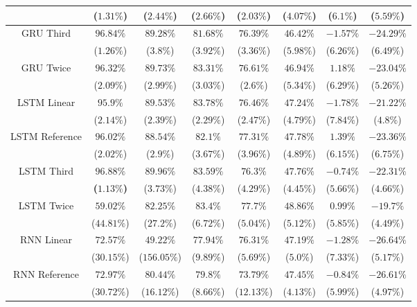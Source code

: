 \begin{table}[!ht]
{\begin{tabular}{|c|c|c|c|c|c|c|c|}
			 & ($1.31\%$) & ($2.44\%$) & ($2.66\%$) & ($2.03\%$) & ($4.07\%$) & ($6.1\%$) & ($5.59\%$) \\ \hline
			\multirow{2}{*}{GRU Third} & $96.84\%$ & $89.28\%$ & $81.68\%$ & $76.39\%$ & $46.42\%$ & $-1.57\%$ & $-24.29\%$ \\
			 & ($1.26\%$) & ($3.8\%$) & ($3.92\%$) & ($3.36\%$) & ($5.98\%$) & ($6.26\%$) & ($6.49\%$) \\ \hline
			\multirow{2}{*}{GRU Twice} & $96.32\%$ & $89.73\%$ & $83.31\%$ & $76.61\%$ & $46.94\%$ & $1.18\%$ & $-23.04\%$ \\
			 & ($2.09\%$) & ($2.99\%$) & ($3.03\%$) & ($2.6\%$) & ($5.34\%$) & ($6.29\%$) & ($5.26\%$) \\ \hline
			\multirow{2}{*}{LSTM Linear} & $95.9\%$ & $89.53\%$ & $83.78\%$ & $76.46\%$ & $47.24\%$ & $-1.78\%$ & $-21.22\%$ \\
			 & ($2.14\%$) & ($2.39\%$) & ($2.29\%$) & ($2.47\%$) & ($4.79\%$) & ($7.84\%$) & ($4.8\%$) \\ \hline
			\multirow{2}{*}{LSTM Reference} & $96.02\%$ & $88.54\%$ & $82.1\%$ & $77.31\%$ & $47.78\%$ & $1.39\%$ & $-23.36\%$ \\
			 & ($2.02\%$) & ($2.9\%$) & ($3.67\%$) & ($3.96\%$) & ($4.89\%$) & ($6.15\%$) & ($6.75\%$) \\ \hline
			\multirow{2}{*}{LSTM Third} & $\mathbf{96.88\%}$ & $89.96\%$ & $83.59\%$ & $76.3\%$ & $47.76\%$ & $-0.74\%$ & $-22.31\%$ \\
			 & \textbf{(}$\mathbf{1.13\%}$\textbf{)} & ($3.73\%$) & ($4.38\%$) & ($4.29\%$) & ($4.45\%$) & ($5.66\%$) & ($4.66\%$) \\ \hline
			\multirow{2}{*}{LSTM Twice} & $59.02\%$ & $82.25\%$ & $83.4\%$ & $77.7\%$ & $48.86\%$ & $0.99\%$ & $-19.7\%$ \\
			 & ($44.81\%$) & ($27.2\%$) & ($6.72\%$) & ($5.04\%$) & ($5.12\%$) & ($5.85\%$) & ($4.49\%$) \\ \hline
			\multirow{2}{*}{RNN Linear} & $72.57\%$ & $49.22\%$ & $77.94\%$ & $76.31\%$ & $47.19\%$ & $-1.28\%$ & $-26.64\%$ \\
			 & ($30.15\%$) & ($156.05\%$) & ($9.89\%$) & ($5.69\%$) & ($5.0\%$) & ($7.33\%$) & ($5.17\%$) \\ \hline
			\multirow{2}{*}{RNN Reference} & $72.97\%$ & $80.44\%$ & $79.8\%$ & $73.79\%$ & $47.45\%$ & $-0.84\%$ & $-26.61\%$ \\
			 & ($30.72\%$) & ($16.12\%$) & ($8.66\%$) & ($12.13\%$) & ($4.13\%$) & ($5.99\%$) & ($4.97\%$) \\ \hline

\end{tabular}}
\end{table}
